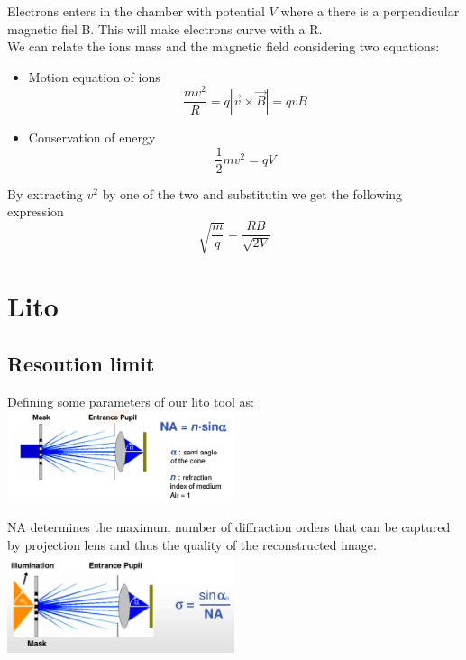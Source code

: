 Electrons enters in the chamber with potential $V$ where a there is a perpendicular magnetic fiel B. This will make electrons curve with a R.\\
We can relate the ions mass and the magnetic field considering two equations:\begin{itemize}
\item Motion equation of ions
\begin{equation}
\frac{mv^2}{R}=q|\vec{v}\times \vec{B}|=qvB
\end{equation}
\item Conservation of energy
\begin{equation}
\frac{1}{2}mv^2=qV
\end{equation}
\end{itemize}
By extracting $v^2$ by one of the two and substitutin we get the following expression
\begin{equation}
\sqrt{\frac{m}{q}}=\frac{RB}{\sqrt{2V}}
\end{equation}


\section{Lito}

\subsection{Resoution limit}
Defining some parameters of our lito tool as:\\

\centering
\includegraphics[width=0.5\textwidth]{NA.png}\\
\raggedright

NA determines the maximum number of diffraction orders that can be captured by projection lens and thus the quality of the reconstructed image.\\

\centering
\includegraphics[width=0.5\textwidth]{sigma.png}\\
\raggedright

